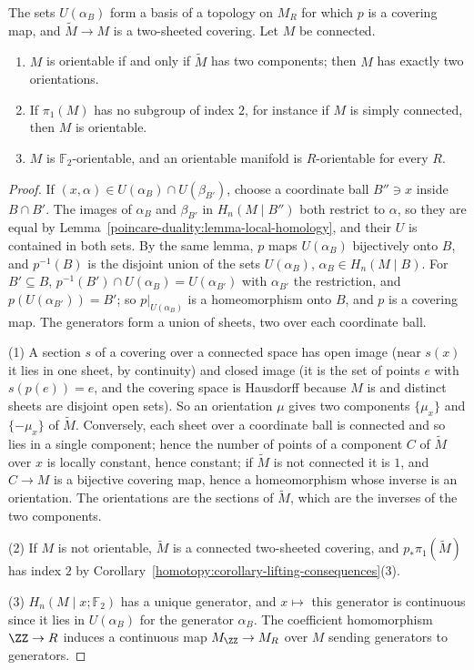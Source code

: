 \begin{proposition}\label{poincare-duality:proposition-orientation-covering}
The sets $U(\alpha_B)$ form a basis of a topology on $M_R$ for which $p$ is a covering map, and $\tilde{M} \to M$ is a two-sheeted covering. Let $M$ be connected.
\begin{enumerate}
\item $M$ is orientable if and only if $\tilde{M}$ has two components; then $M$ has exactly two orientations.
\item If $\pi_1(M)$ has no subgroup of index $2$, for instance if $M$ is simply connected, then $M$ is orientable.
\item $M$ is $\mathbb{F}_2$-orientable, and an orientable manifold is $R$-orientable for every $R$.
\end{enumerate}
\end{proposition}

\begin{proof}
If $(x, \alpha) \in U(\alpha_B) \cap U(\beta_{B'})$, choose a coordinate ball $B'' \ni x$ inside $B \cap B'$. The images of $\alpha_B$ and $\beta_{B'}$ in
$H_n(M \mid B'')$ both restrict to $\alpha$, so they are equal by Lemma~\ref{poincare-duality:lemma-local-homology}, and their $U$ is contained in both sets.
By the same lemma, $p$ maps $U(\alpha_B)$ bijectively onto $B$, and $p^{-1}(B)$ is the disjoint union of the sets $U(\alpha_B)$, $\alpha_B \in H_n(M \mid B)$. For
$B' \subseteq B$, $p^{-1}(B') \cap U(\alpha_B) = U(\alpha_{B'})$ with $\alpha_{B'}$ the restriction, and $p(U(\alpha_{B'})) = B'$; so $p|_{U(\alpha_B)}$ is a homeomorphism
onto $B$, and $p$ is a covering map. The generators form a union of sheets, two over each coordinate ball.

(1) A section $s$ of a covering over a connected space has open image (near $s(x)$ it lies in one sheet, by continuity) and closed image (it is the set of points $e$ with $s(p(e)) = e$, and the covering space is Hausdorff because $M$ is and distinct sheets are
disjoint open sets). So an orientation $\mu$ gives two components $\{\mu_x\}$ and $\{-\mu_x\}$ of
$\tilde{M}$. Conversely, each sheet over a coordinate ball is connected and so lies in a single component; hence the number of points of a component
$C$ of $\tilde{M}$ over $x$ is locally constant, hence constant; if $\tilde{M}$ is not connected it is $1$,
and $C \to M$ is a bijective covering map, hence a homeomorphism whose inverse is an orientation. The orientations are the sections of $\tilde{M}$, which are the
inverses of the two components.

(2) If $M$ is not orientable, $\tilde{M}$ is a connected two-sheeted covering, and $p_*\pi_1(\tilde{M})$ has index $2$ by
Corollary~\ref{homotopy:corollary-lifting-consequences}(3).

(3) $H_n(M \mid x; \mathbb{F}_2)$ has a unique generator, and $x \mapsto$ this generator is continuous since it lies in $U(\alpha_B)$ for the generator $\alpha_B$. The
coefficient homomorphism $\ZZ \to R$ induces a continuous map $M_\ZZ \to M_R$ over $M$ sending generators to generators.
\end{proof}

